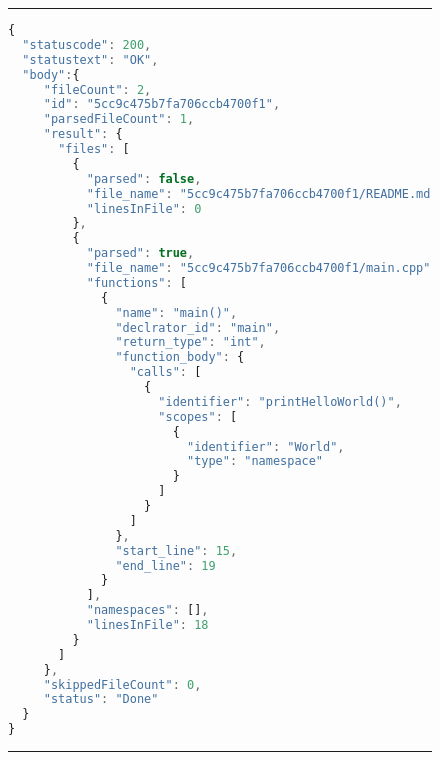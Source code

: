 \begin{figure}
\noindent\rule{\textwidth}{1pt}
\begin{lstlisting}[language=JavaScript, caption= {JSON structure from API}, label={lst:apiFormat}]
{
  "statuscode": 200,
  "statustext": "OK",
  "body":{
     "fileCount": 2,
     "id": "5cc9c475b7fa706ccb4700f1",
     "parsedFileCount": 1,
     "result": {
       "files": [
         {
           "parsed": false,
           "file_name": "5cc9c475b7fa706ccb4700f1/README.md",
           "linesInFile": 0
         },
         {
           "parsed": true,
           "file_name": "5cc9c475b7fa706ccb4700f1/main.cpp",
           "functions": [
             {
               "name": "main()",
               "declrator_id": "main",
               "return_type": "int",
               "function_body": {
                 "calls": [
                   {
                     "identifier": "printHelloWorld()",
                     "scopes": [
                       {
                         "identifier": "World",
                         "type": "namespace"
                       }
                     ]
                   }
                 ]
               },
               "start_line": 15,
               "end_line": 19
             }
           ],
           "namespaces": [],
           "linesInFile": 18
         }
       ]
     },
     "skippedFileCount": 0,
     "status": "Done"
  }
}
\end{lstlisting}
\noindent\rule{\textwidth}{1pt}
\end{figure}